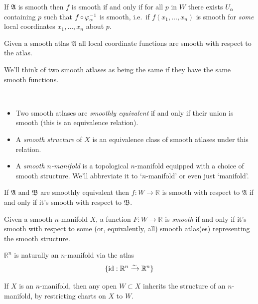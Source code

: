\documentclass[a4paper,11pt]{article}
\begin{document}
	\begin{lem}
		If $\mathfrak{A}$ is smooth then $f$ is smooth if and only if for all $p$ in $W$ there exists $U_\alpha$ containing $p$ such that $f \operatorname{\circ} \varphi_\alpha^{-1}$ is smooth, i.e.\ if $f(x_1,\dots,x_n)$ is smooth for \emph{some} local coordinates $x_1, \dots,x_n$ about $p$. 
	\end{lem}

	\begin{cor}
		Given a smooth atlas $\mathfrak{A}$ all local coordinate functions are smooth with respect to the atlas.
	\end{cor}

	We'll think of two smooth atlases as being the same if they have the same smooth functions.

	\begin{defi} \ 
		\begin{itemize}
			\item Two smooth atlases are \emph{smoothly equivalent} if and only if their union is smooth (this is an equivalence relation).
			\item A \emph{smooth structure} of $X$ is an equivalence class of smooth atlases under this relation.
			\item A \emph{smooth $n$-manifold} is a topological $n$-manifold equipped with a choice of smooth structure. We'll abbreviate it to `$n$-manifold' or even just `manifold'.
		\end{itemize}
	\end{defi}

	\begin{lem}
		If $\mathfrak{A}$ and $\mathfrak{B}$ are smoothly equivalent then $f: W \to \mathbb{R}$ is smooth with respect to $\mathfrak{A}$ if and only if it's smooth with respect to $\mathfrak{B}$.
	\end{lem}

	\begin{defi}
		Given a smooth $n$-manifold $X$, a function $F: W \to \mathbb{R}$ is \emph{smooth} if and only if it's smooth with respect to some (or, equivalently, all) smooth atlas(es) representing the smooth structure.
	\end{defi}

	\begin{ex}
		$\mathbb{R}^n$ is naturally an $n$-manifold via the atlas
		\[
			\{\operatorname{id}: \mathbb{R}^n \xrightarrow{\sim}\mathbb{R}^n\}
		\]
	\end{ex}
	\begin{ex}
		If $X$ is an $n$-manifold, then any open $W \subset X$ inherits the structure of an $n$-manifold, by restricting charts on $X$ to $W$.
	\end{ex}
\end{document}

